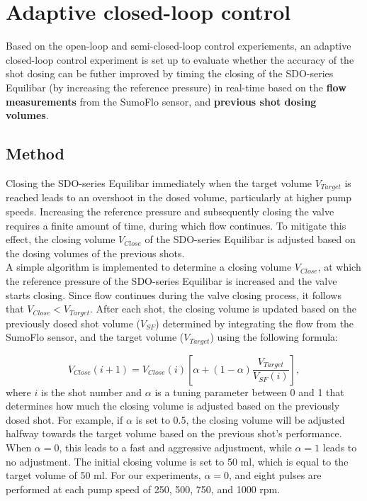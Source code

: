\documentclass[12pt,a4paper]{article}
\begin{document}
\clearpage
\newpage
\section{Adaptive closed-loop control}
\label{sec:adaptive_closed_loop}
Based on the open-loop and semi-closed-loop control experiements, an adaptive closed-loop control experiment is set up to evaluate whether the accuracy of the shot dosing can be futher improved by timing the closing of the SDO-series Equilibar (by increasing the reference pressure) in real-time based on the \textbf{flow measurements} from the SumoFlo sensor, and \textbf{previous shot dosing volumes}. 

\subsection{Method}
\label{sec:adaptive_closed_loop_method}
Closing the SDO-series Equilibar immediately when the target volume $V_{Target}$ is reached leads to an overshoot in the dosed volume, particularly at higher pump speeds. Increasing the reference pressure and subsequently closing the valve requires a finite amount of time, during which flow continues. To mitigate this effect, the closing volume $V_{Close}$ of the SDO-series Equilibar is adjusted based on the dosing volumes of the previous shots. \\
A simple algorithm is implemented to determine a closing volume $V_{Close}$, at which the reference pressure of the SDO-series Equilibar is increased and the valve starts closing. Since flow continues during the valve closing process, it follows that $V_{Close} < V_{Target}$. After each shot, the closing volume is updated based on the previously dosed shot volume ($V_{SF}$) determined by integrating the flow from the SumoFlo sensor, and the target volume ($V_{Target}$) using the following formula:

\begin{equation}
    V_{Close}(i+1) = V_{Close}(i) \left[ \alpha + \left( 1 - \alpha \right) \frac{V_{Target}}{V_{SF}(i)} \right],\label{eq:adaptive_closed_loop_adjustment}
\end{equation}
where $i$ is the shot number and $\alpha$ is a tuning parameter between 0 and 1 that determines how much the closing volume is adjusted based on the previously dosed shot. For example, if $\alpha$ is set to 0.5, the closing volume will be adjusted halfway towards the target volume based on the previous shot's performance. When $\alpha=0$, this leads to a fast and aggressive adjustment, while $\alpha=1$ leads to no adjustment. The initial closing volume is set to 50 ml, which is equal to the target volume of 50 ml. For our experiments, $\alpha=0$, and eight pulses are performed at each pump speed of 250, 500, 750, and 1000 rpm. 
\end{document}
